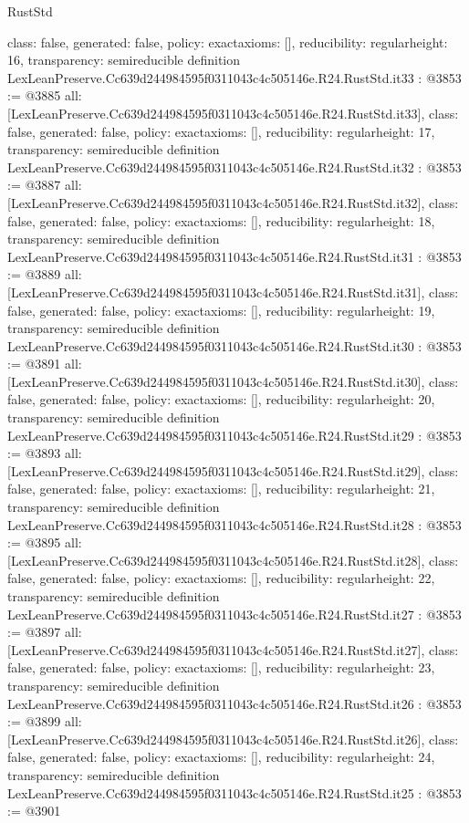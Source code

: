 \begin{lexlean}{RustStd}
\begin{coremodule}
{  class: false,
  generated: false,
  policy: exact{axioms: []},
  reducibility: regular{height: 16},
  transparency: semireducible
}
definition LexLeanPreserve.Cc639d244984595f0311043c4c505146e.R24.RustStd.it33 : @3853 := @3885 {
  all: [LexLeanPreserve.Cc639d244984595f0311043c4c505146e.R24.RustStd.it33],
  class: false,
  generated: false,
  policy: exact{axioms: []},
  reducibility: regular{height: 17},
  transparency: semireducible
}
definition LexLeanPreserve.Cc639d244984595f0311043c4c505146e.R24.RustStd.it32 : @3853 := @3887 {
  all: [LexLeanPreserve.Cc639d244984595f0311043c4c505146e.R24.RustStd.it32],
  class: false,
  generated: false,
  policy: exact{axioms: []},
  reducibility: regular{height: 18},
  transparency: semireducible
}
definition LexLeanPreserve.Cc639d244984595f0311043c4c505146e.R24.RustStd.it31 : @3853 := @3889 {
  all: [LexLeanPreserve.Cc639d244984595f0311043c4c505146e.R24.RustStd.it31],
  class: false,
  generated: false,
  policy: exact{axioms: []},
  reducibility: regular{height: 19},
  transparency: semireducible
}
definition LexLeanPreserve.Cc639d244984595f0311043c4c505146e.R24.RustStd.it30 : @3853 := @3891 {
  all: [LexLeanPreserve.Cc639d244984595f0311043c4c505146e.R24.RustStd.it30],
  class: false,
  generated: false,
  policy: exact{axioms: []},
  reducibility: regular{height: 20},
  transparency: semireducible
}
definition LexLeanPreserve.Cc639d244984595f0311043c4c505146e.R24.RustStd.it29 : @3853 := @3893 {
  all: [LexLeanPreserve.Cc639d244984595f0311043c4c505146e.R24.RustStd.it29],
  class: false,
  generated: false,
  policy: exact{axioms: []},
  reducibility: regular{height: 21},
  transparency: semireducible
}
definition LexLeanPreserve.Cc639d244984595f0311043c4c505146e.R24.RustStd.it28 : @3853 := @3895 {
  all: [LexLeanPreserve.Cc639d244984595f0311043c4c505146e.R24.RustStd.it28],
  class: false,
  generated: false,
  policy: exact{axioms: []},
  reducibility: regular{height: 22},
  transparency: semireducible
}
definition LexLeanPreserve.Cc639d244984595f0311043c4c505146e.R24.RustStd.it27 : @3853 := @3897 {
  all: [LexLeanPreserve.Cc639d244984595f0311043c4c505146e.R24.RustStd.it27],
  class: false,
  generated: false,
  policy: exact{axioms: []},
  reducibility: regular{height: 23},
  transparency: semireducible
}
definition LexLeanPreserve.Cc639d244984595f0311043c4c505146e.R24.RustStd.it26 : @3853 := @3899 {
  all: [LexLeanPreserve.Cc639d244984595f0311043c4c505146e.R24.RustStd.it26],
  class: false,
  generated: false,
  policy: exact{axioms: []},
  reducibility: regular{height: 24},
  transparency: semireducible
}
definition LexLeanPreserve.Cc639d244984595f0311043c4c505146e.R24.RustStd.it25 : @3853 := @3901 {
}
\end{coremodule}
\end{lexlean}
